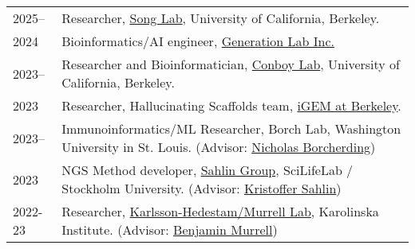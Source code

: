 
\begin{longtable}[l]{@{}p{} p{}}

    2025-- & Researcher, \href{https://people.eecs.berkeley.edu/~yss/}{Song Lab}, University of California, Berkeley. \\

    2024 & Bioinformatics/AI engineer, \href{https://www.generationlab.com/}{Generation Lab Inc.} \\

    2023-- & Researcher and Bioinformatician, \href{https://conboylab.berkeley.edu/}{Conboy Lab}, University of California, Berkeley. \\

    2023 & Researcher, Hallucinating Scaffolds team, \href{https://igem.studentorg.berkeley.edu/teams/hallucinating-scaffolds/}{iGEM at Berkeley}. \\

    2023-- & Immunoinformatics/ML Researcher, Borch Lab, Washington University in St. Louis. (Advisor: \href{https://www.borch.dev/}{Nicholas Borcherding}) \\

    2023 & NGS Method developer, \href{https://sahlingroup.github.io/}{Sahlin Group}, SciLifeLab / Stockholm University. (Advisor: \href{https://www.scilifelab.se/researchers/kristoffer-sahlin/}{Kristoffer Sahlin}) \\

    2022-23 & Researcher, \href{https://ki.se/en/people/benjamin-murrell}{Karlsson-Hedestam/Murrell Lab}, Karolinska Institute. (Advisor: \href{https://ki.se/en/people/benjamin-murrell}{Benjamin Murrell}) \\

\end{longtable}
